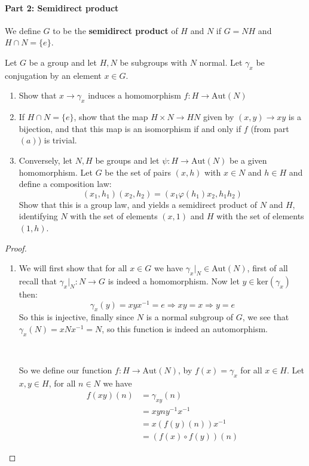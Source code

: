 \paragraph*{Part 2: Semidirect product}
We define $G$ to be the \textbf{semidirect product} of $H$ and $N$ if $G=NH$ and $H\cap N = \{e\}$.


\begin{exercise}
Let $G$ be a group and let $H,N$ be subgroups with $N$ normal. Let $\gamma_x$ be conjugation by an element $x\in G$.\begin{enumerate}[label = (\alph*)]
\item Show that $x\rightarrow \gamma_x$ induces a homomorphism $f\colon H\rightarrow \text{Aut}(N)$
\item If $H\cap N = \{e\}$, show that the map $H\times N\rightarrow HN$ given by $(x,y) \rightarrow xy$ is a bijection, and that this map is an isomorphism if and only if $f$ (from part $(a)$) is trivial.
\item Conversely, let $N,H$ be groups and let $\psi\colon H\rightarrow \text{Aut}(N)$ be a given homomorphism. Let $G$ be the set of pairs $(x,h)$ with $x\in N$ and $h\in H$ and define a composition law:\begin{equation*}
(x_1,h_1)(x_2,h_2) = ({x_1}{\varphi(h_1)x_2}, h_1h_2)
\end{equation*}
Show that this is a group law, and yields a semidirect product of $N$ and $H$, identifying $N$ with the set of elements $(x,1)$ and $H$ with the set of elements $(1,h)$.
\end{enumerate}
\begin{proof}
\begin{enumerate}[label = (\alph*)]
\item We will first show that for all $x\in G$ we have $\gamma_x|_N\in \text{Aut}(N)$, first of all recall that $\gamma_x|_N\colon N\rightarrow G$ is indeed a homomorphism. Now let $y\in \text{ker}(\gamma_x)$ then:
\[
\gamma_x(y) = xyx^{-1} = e \Rightarrow xy = x \Rightarrow y = e
\]
So this is injective, finally since $N$ is a normal subgroup of $G$, we see that $\gamma_x(N) = xNx^{-1} = N$, so this function is indeed an automorphism.

\

So we define our function $f\colon H\rightarrow \text{Aut}(N)$, by $f(x) = \gamma_x$ for all $x\in H$. Let $x,y\in H$, for all $n\in N$ we have \begin{align*}
f(xy)(n) &= \gamma_{xy}(n)\\
 &= xyny^{-1}x^{-1}\\
 &= x({f(y)(n)})x^{-1}\\
 &=({f(x)\circ f(y)})(n)
\end{align*}


\end{enumerate}
\end{proof}
\end{exercise}
